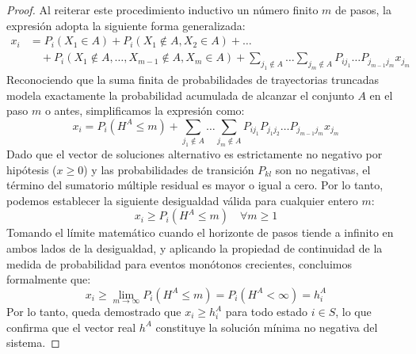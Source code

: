 \begin{teo}
\begin{proof}
    \noindent
    Al reiterar este procedimiento inductivo un número finito $m$ de pasos, la expresión adopta la siguiente forma generalizada:
    \begin{align*}
        x_i &= P_i(X_1 \in A) + P_i(X_1 \notin A, X_2 \in A) + \dots \\
        &\quad + P_i(X_1 \notin A, \dots, X_{m-1} \notin A, X_m \in A) + \sum_{j_1 \notin A} \dots \sum_{j_m \notin A} P_{i j_1} \dots P_{j_{m-1} j_m} x_{j_m}
    \end{align*}
    Reconociendo que la suma finita de probabilidades de trayectorias truncadas modela exactamente la probabilidad acumulada de alcanzar el conjunto $A$ en el paso $m$ o antes, simplificamos la expresión como:
    \[
    x_i = P_i(H^A \leq m) + \sum_{j_1 \notin A} \dots \sum_{j_m \notin A} P_{i j_1} P_{j_1 j_2} \dots P_{j_{m-1} j_m} x_{j_m}
    \]
    Dado que el vector de soluciones alternativo es estrictamente no negativo por hipótesis ($x \geq 0$) y las probabilidades de transición $P_{kl}$ son no negativas, el término del sumatorio múltiple residual es mayor o igual a cero. Por lo tanto, podemos establecer la siguiente desigualdad válida para cualquier entero $m$:
    \[
    x_i \geq P_i(H^A \leq m) \quad \forall m \geq 1
    \]
    Tomando el límite matemático cuando el horizonte de pasos tiende a infinito en ambos lados de la desigualdad, y aplicando la propiedad de continuidad de la medida de probabilidad para eventos monótonos crecientes, concluimos formalmente que:
    \[
    x_i \geq \lim_{m \to \infty} P_i(H^A \leq m) = P_i(H^A < \infty) = h_i^A
    \]
    Por lo tanto, queda demostrado que $x_i \geq h_i^A$ para todo estado $i \in S$, lo que confirma que el vector real $h^A$ constituye la solución mínima no negativa del sistema.
\end{proof}
\end{teo}

